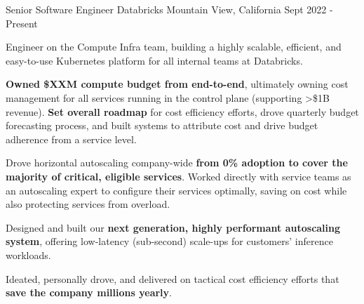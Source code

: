 

\begin{cventries}


\cventry
{Senior Software Engineer}
{\acvHeaderIconSep Databricks}
{Mountain View, California}
{Sept 2022 - Present}
{
	\begin{cvitems}
		\item Engineer on the Compute Infra team, building a highly scalable, efficient, and easy-to-use Kubernetes platform for all internal teams at Databricks.
		\item \textbf{Owned \$XXM compute budget from end-to-end}, ultimately owning cost management for all services running in the control plane (supporting >\$1B revenue). \textbf{Set overall roadmap} for cost efficiency efforts, drove quarterly budget forecasting process, and built systems to attribute cost and drive budget adherence from a service level. 
		\item Drove horizontal autoscaling company-wide \textbf{from 0\% adoption to cover the majority of critical, eligible services}. Worked directly with service teams as an autoscaling expert to configure their services optimally, saving on cost while also protecting services from overload. 
		\item Designed and built our \textbf{next generation, highly performant autoscaling system}, offering low-latency (sub-second) scale-ups for customers' inference workloads. 
		\item Ideated, personally drove, and delivered on tactical cost efficiency efforts that \textbf{save the company millions yearly}. 
	\end{cvitems}
}


\end{cventries}
